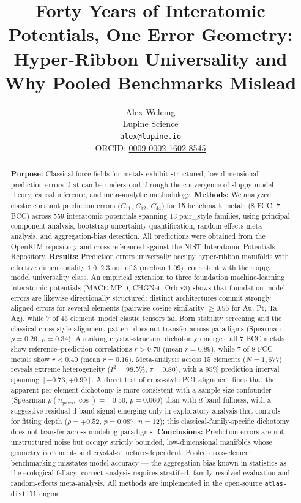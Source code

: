 \documentclass[twocolumn,10pt]{article}
\begin{document}
\title{\bfseries Forty Years of Interatomic Potentials, One Error Geometry: Hyper-Ribbon Universality and Why Pooled Benchmarks Mislead}
\author{Alex Welcing\\
\small Lupine Science\\
\small \texttt{alex@lupine.io}\\
\small ORCID: \href{https://orcid.org/0009-0002-1602-8545}{0009-0002-1602-8545}}
\date{}

\begin{abstract}
\noindent\textbf{Purpose:} Classical force fields for metals exhibit structured, low-dimensional prediction errors that can be understood through the convergence of sloppy model theory, causal inference, and meta-analytic methodology.
\textbf{Methods:} We analyzed elastic constant prediction errors ($C_{11}$, $C_{12}$, $C_{44}$) for 15 benchmark metals (8 FCC, 7 BCC) across 559 interatomic potentials spanning 13 pair\_style families, using principal component analysis, bootstrap uncertainty quantification, random-effects meta-analysis, and aggregation-bias detection. All predictions were obtained from the OpenKIM repository and cross-referenced against the NIST Interatomic Potentials Repository.
\textbf{Results:} Prediction errors universally occupy hyper-ribbon manifolds with effective dimensionality $1.0$--$2.3$ out of 3 (median $1.09$), consistent with the sloppy model universality class. An empirical extension to three foundation machine-learning interatomic potentials (MACE-MP-0, CHGNet, Orb-v3) shows that foundation-model errors are likewise directionally structured: distinct architectures commit strongly aligned errors for several elements (pairwise cosine similarity $\geq 0.95$ for Au, Pt, Ta, Ag), while 7 of 45 element--model elastic tensors fail Born stability screening and the classical cross-style alignment pattern does not transfer across paradigms (Spearman $\rho = 0.26$, $p = 0.34$). A striking crystal-structure dichotomy emerges: all 7 BCC metals show reference--prediction correlations $r>0.70$ (mean $r=0.89$), while 7 of 8 FCC metals show $r<0.40$ (mean $r=0.16$). Meta-analysis across 15 elements ($N=1{,}677$) reveals extreme heterogeneity ($I^2=98.5\%$, $\tau=0.80$), with a 95\% prediction interval spanning $[-0.73, +0.99]$. A direct test of cross-style PC1 alignment finds that the apparent per-element dichotomy is more consistent with a sample-size confounder (Spearman $\rho(n_{\text{pairs}}, \overline{\cos}) = -0.50$, $p = 0.060$) than with $d$-band fullness, with a suggestive residual d-band signal emerging only in exploratory analysis that controls for fitting depth ($\rho = +0.52$, $p = 0.087$, $n=12$); this classical-family-specific dichotomy does not transfer across modeling paradigms.
\textbf{Conclusions:} Prediction errors are not unstructured noise but occupy strictly bounded, low-dimensional manifolds whose geometry is element- and crystal-structure-dependent. Pooled cross-element benchmarking misstates model accuracy --- the aggregation bias known in statistics as the ecological fallacy; correct analysis requires stratified, family-resolved evaluation and random-effects meta-analysis. All methods are implemented in the open-source \texttt{atlas-distill} engine.
\end{abstract}
\end{document}
